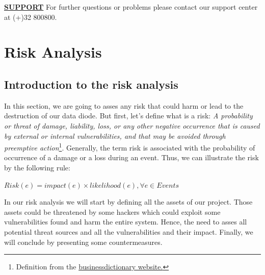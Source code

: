 \documentclass[a4paper,10pt]{article}
\begin{document}
\underline{\textbf{SUPPORT}} For further questions or problems please contact our support center at (+)32 800800.
\newpage
\section{Risk Analysis}

\subsection{Introduction to the risk analysis}
In this section, we are going to asses any risk that could harm or lead to the destruction of our data diode. But first, let's define what is a risk: \emph{A probability or threat of damage, liability, loss, or any other negative occurrence that is caused by external or internal vulnerabilities, and that may be avoided through preemptive action}\footnote{Definition from the \href{http://www.businessdictionary.com/definition/risk.html}{businessdictionary website.}}. Generally, the term risk is associated with the probability of occurrence of a damage or a loss during an event. Thus, we can illustrate the risk by the following rule:
\begin{center}
\centering
$Risk(e)= impact(e) \times likelihood(e), \forall e \in Events$
\end{center}

In our risk analysis we will start by defining all the assets of our project. Those assets could be threatened by some hackers which could exploit some vulnerabilities found and harm the entire system. Hence, the need to asses all potential threat sources and all the vulnerabilities and their impact. Finally, we will conclude by presenting some countermeasures.
\end{document}
